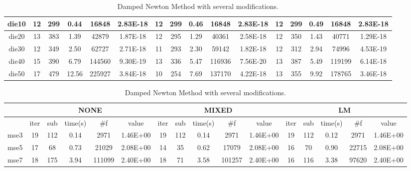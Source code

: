 \documentclass{article}
\begin{document}
\begin{table}[H]
\begin{tabular}{|c|c|c|c|c|c|c|c|c|c|c|c|c|c|c|c|}
		die10 & 12   & 299 & 0.44     & 16848  & 2.83E-18 & 12   & 299 & 0.46    & 16848  & 2.83E-18 & 12   & 299 & 0.49    & 16848  & 2.83E-18 \\ \hline
		die20 & 13   & 383 & 1.39     & 42879  & 1.87E-18 & 12   & 295 & 1.29    & 40361  & 2.58E-18 & 12   & 350 & 1.43    & 40771  & 1.29E-18 \\ \hline
		die30 & 12   & 349 & 2.50     & 62727  & 2.71E-18 & 11   & 293 & 2.30    & 59142  & 1.82E-18 & 12   & 312 & 2.94    & 74996  & 4.53E-19 \\ \hline
		die40 & 15   & 390 & 6.79     & 144560 & 9.30E-19 & 13   & 336 & 5.47    & 116936 & 7.56E-20 & 13   & 387 & 5.49    & 119199 & 6.14E-18 \\ \hline
		die50 & 17   & 479 & 12.56    & 225927 & 3.84E-18 & 10   & 254 & 7.69    & 137170 & 4.22E-18 & 13   & 355 & 9.92    & 178765 & 3.46E-18 \\ \hline
	\end{tabular}

	\begin{tabular}{|c|c|c|c|c|c|c|c|c|c|c|c|c|c|c|c|}
		\hline
		& \multicolumn{5}{c|}{NONE}                 & \multicolumn{5}{c|}{MIXED}               & \multicolumn{5}{c|}{LM}                  \\ \hline
		& iter & sub & time(s)  & \#f    & value    & iter & sub & time(s) & \#f    & value    & iter & sub & time(s) & \#f    & value    \\ \hline
		mse3  & 19   & 112 & 0.14 & 2971   & 1.46E+00 & 19   & 112 & 0.14    & 2971   & 1.46E+00 & 19   & 112 & 0.12    & 2971   & 1.46E+00 \\ \hline
		mse5  & 17   & 68  & 0.73     & 21029  & 2.08E+00 & 14   & 35  & 0.62    & 17079  & 2.08E+00 & 16   & 70  & 0.90    & 22715  & 2.08E+00 \\ \hline
		mse7  & 18   & 175 & 3.94     & 111099 & 2.40E+00 & 18   & 71  & 3.58    & 101257 & 2.40E+00 & 16   & 116 & 3.38    & 97620  & 2.40E+00 \\ \hline
	\end{tabular}
\caption{Damped Newton Method with several modifications.}
\end{table}
\end{document}
